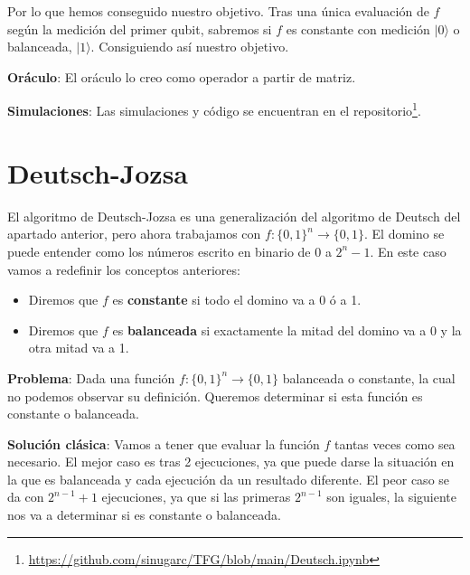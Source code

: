 Por lo que hemos conseguido nuestro objetivo. Tras una única evaluación de $f$ según la medición del primer qubit, sabremos si $f$ es constante con medición $|0\rangle$ o balanceada, $|1\rangle$. Consiguiendo así nuestro objetivo.

\vspace{5pt}

\textbf{Oráculo}: El oráculo lo creo como operador a partir de matriz.

\vspace{5pt}

\textbf{Simulaciones}: Las simulaciones y código se encuentran en el repositorio\footnote{\url{https://github.com/sinugarc/TFG/blob/main/Deutsch.ipynb}}.

\section{Deutsch-Jozsa}
\label{Sec3.3:Deutsch-Jozsa}
 El algoritmo de Deutsch-Jozsa\cite{B:QuantumScientist:2008} es una generalización del algoritmo de Deutsch del apartado anterior, pero ahora trabajamos con $f:\{0,1\}^{n} \rightarrow\{0,1\}$. El domino se puede entender como los números escrito en binario de 0 a $2^{n}-1$. En este caso vamos a redefinir los conceptos anteriores:

 \begin{itemize}
     \item Diremos que $f$ es \textbf{constante} si todo el domino va a 0 ó a 1.
     \item Diremos que $f$ es \textbf{balanceada} si exactamente la mitad del domino va a 0 y la otra mitad va a 1.
 \end{itemize}

 \textbf{Problema}\label{P:DJ}: Dada una función $f:\{0,1\}^{n} \rightarrow\{0,1\}$ balanceada o constante, la cual no podemos observar su definición. Queremos determinar si esta función es constante o balanceada.

 \vspace{10pt}

 \textbf{Solución clásica}: Vamos a tener que evaluar la función $f$ tantas veces como sea necesario. El mejor caso es tras 2 ejecuciones, ya que puede darse la situación en la que es balanceada y cada ejecución da un resultado diferente. El peor caso se da con $2^{n-1}+1$ ejecuciones, ya que si las primeras $2^{n-1}$ son iguales, la siguiente nos va a determinar si es constante o balanceada.  \newline

